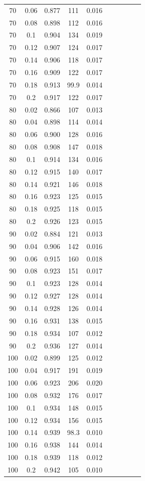 \documentclass[12pt]{article}
\begin{document}
\begin{table}[h!]
\begin{tabular}{c c | c | c c ||c c | c | c c |}
			70&0.06&0.877&111&0.016\\ 
			70&0.08&0.898&112&0.016\\ 
			70&0.1&0.904&134&0.019\\ 
			70&0.12&0.907&124&0.017\\ 
			70&0.14&0.906&118&0.017\\ 
			70&0.16&0.909&122&0.017\\ 
			70&0.18&0.913&99.9&0.014\\ 
			70&0.2&0.917&122&0.017\\ 
			80&0.02&0.866&107&0.013\\ 
			80&0.04&0.898&114&0.014\\ 
			80&0.06&0.900&128&0.016\\ 
			80&0.08&0.908&147&0.018\\ 
			80&0.1&0.914&134&0.016\\ 
			80&0.12&0.915&140&0.017\\ 
			80&0.14&0.921&146&0.018\\ 
			80&0.16&0.923&125&0.015\\ 
			80&0.18&0.925&118&0.015\\ 
			80&0.2&0.926&123&0.015\\ 
			90&0.02&0.884&121&0.013\\ 
			90&0.04&0.906&142&0.016\\ 
			90&0.06&0.915&160&0.018\\ 
			90&0.08&0.923&151&0.017\\ 
			90&0.1&0.923&128&0.014\\ 
			90&0.12&0.927&128&0.014\\ 
			90&0.14&0.928&126&0.014\\ 
			90&0.16&0.931&138&0.015\\ 
			90&0.18&0.934&107&0.012\\ 
			90&0.2&0.936&127&0.014\\ 
			100&0.02&0.899&125&0.012\\ 
			100&0.04&0.917&191&0.019\\ 
			100&0.06&0.923&206&0.020\\ 
			100&0.08&0.932&176&0.017\\ 
			100&0.1&0.934&148&0.015\\ 
			100&0.12&0.934&156&0.015\\ 
			100&0.14&0.939&98.3&0.010\\ 
			100&0.16&0.938&144&0.014\\ 
			100&0.18&0.939&118&0.012\\ 
			100&0.2&0.942&105&0.010\\ 
			\hline
		\end{tabular}
		\end{table}
\end{document}
